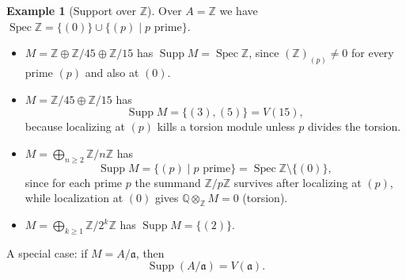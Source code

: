 \documentclass[11pt,a4paper]{article}
\theoremstyle{definition}
\newtheorem{example}[definition]{Example}
\theoremstyle{plain}
\theoremstyle{remark}
\newcommand{\Spec}{\operatorname{Spec}}
\newcommand{\Supp}{\operatorname{Supp}}
\begin{document}
\begin{example}[Support over $\mathbb Z$]
Over $A=\mathbb Z$ we have $\Spec\mathbb Z=\{(0)\}\cup\{(p)\mid p \text{ prime}\}$.

\begin{itemize}
\item $M=\mathbb Z \oplus \mathbb Z/45 \oplus \mathbb Z/15$ has $\Supp M=\Spec\mathbb Z$,
since $(\mathbb Z)_{(p)}\neq 0$ for every prime $(p)$ and also at $(0)$.

\item $M=\mathbb Z/45 \oplus \mathbb Z/15$ has
\[
\Supp M = \{(3),(5)\} = V(15),
\]
because localizing at $(p)$ kills a torsion module unless $p$ divides the torsion.

\item $M=\bigoplus_{n\ge 2}\mathbb Z/n\mathbb Z$ has
\[
\Supp M = \{(p)\mid p \text{ prime}\} = \Spec\mathbb Z\setminus\{(0)\},
\]
since for each prime $p$ the summand $\mathbb Z/p\mathbb Z$ survives after localizing at $(p)$,
while localization at $(0)$ gives $\mathbb Q\otimes_\mathbb Z M=0$ (torsion).

\item $M=\bigoplus_{k\ge 1}\mathbb Z/2^k\mathbb Z$ has $\Supp M=\{(2)\}$.
\end{itemize}
\end{example}

A special case: if $M=A/\mathfrak a$, then
\[
\Supp(A/\mathfrak a)=V(\mathfrak a).
\]
\end{document}
